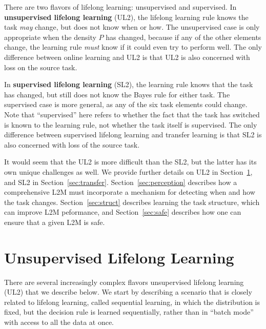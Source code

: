 \documentclass{article}
\begin{document}
There are two flavors of lifelong learning: unsupervised and supervised. 
In \textbf{unsupervised lifelong learning} (UL2), the lifelong learning rule knows the task \emph{may} change, but does not know when or how. The unsupervised case is only appropriate when the density $P$ has changed, because if any of the other elements change, the learning rule \emph{must} know if it could even try to perform well. 
The only difference between online learning and UL2 is that UL2 is also concerned with loss on the source task.


In \textbf{supervised lifelong learning} (SL2), the learning rule knows that the task has changed, but still does not know  the Bayes rule for either task.  The supervised case is more general, as any of the six task elements could change. Note that ``supervised'' here refers to whether the fact that the task has switched is known to the learning rule, not whether the task itself is supervised.  The only difference between supervised lifelong learning and transfer learning is that SL2 is also concerned with loss of the source task. 



It would seem that the UL2 is more difficult than the SL2, but the latter has its own unique challenges as well. We provide further details on UL2  in Section~\ref{sec:continual}, and SL2 in Section~\ref{sec:transfer}.  
Section~\ref{sec:perception} describes how a comprehensive L2M must incorporate a mechanism for detecting when and how the task changes.  Section~\ref{sec:struct} describes learning the task structure, which can improve L2M peformance, and Section~\ref{sec:safe} describes how one can ensure that a given L2M is safe.  



 







\section{Unsupervised Lifelong Learning}
\label{sec:continual}

There are several increasingly complex flavors unsupervised lifelong learning (UL2) that we describe below.  We start by describing a scenario that is closely related to lifelong learning, called sequential learning, in which the distribution is fixed, but the decision rule is learned sequentially, rather than in ``batch mode'' with access to all the data at once. 
\end{document}
